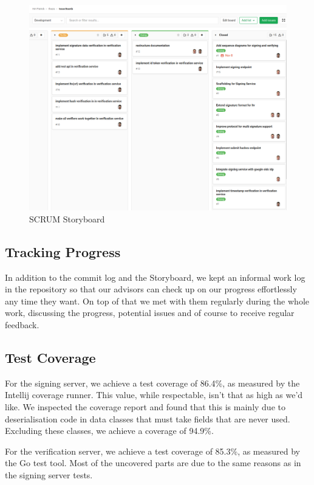 \begin{figure}
    \begin{center}
        \includegraphics[width=0.8\linewidth]{images/board.png}
        \caption{SCRUM Storyboard}
        \label{fig:scrumboard}
    \end{center}
\end{figure}

\subsection{Tracking Progress}\label{subsec:tracking-progress}
In addition to the commit log and the Storyboard,
we kept an informal work log in the repository so that our advisors can check up on our progress effortlessly
any time they want.
On top of that we met with them regularly during the whole work,
discussing the progress, potential issues and of course to receive regular feedback.

\subsection{Test Coverage}\label{subsec:test-coverage}
For the signing server, we achieve a test coverage of 86.4\%,
as measured by the Intellij coverage runner.
This value, while respectable, isn't that as high as we'd like.
We inspected the coverage report and found that this is mainly due to deserialisation code in data classes that must take fields that are never used.
Excluding these classes, we achieve a coverage of 94.9\%.

For the verification server, we achieve a test coverage of 85.3\%,
as measured by the Go test tool.
Most of the uncovered parts are due to the same reasons as in the signing server tests.



